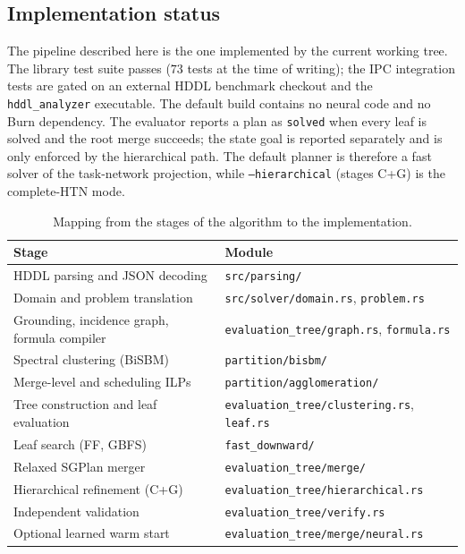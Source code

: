 \documentclass[11pt,a4paper]{article}
\begin{document}
\subsection{Implementation status}
The pipeline described here is the one implemented by the current working
tree. The library test suite passes ($73$ tests at the time of writing); the
IPC integration tests are gated on an external HDDL benchmark checkout and the
\texttt{hddl\_analyzer} executable. The default build contains no neural code
and no Burn dependency. The evaluator reports a plan as \texttt{solved} when
every leaf is solved and the root merge succeeds; the state goal is reported
separately and is only enforced by the hierarchical path. The default planner
is therefore a fast solver of the task-network projection, while
\texttt{--hierarchical} (stages C+G) is the complete-HTN mode.

\begin{table}[h]
\centering
\small
\begin{tabular}{@{}ll@{}}
\toprule
Stage & Module \\
\midrule
HDDL parsing and JSON decoding & \texttt{src/parsing/} \\
Domain and problem translation & \texttt{src/solver/domain.rs}, \texttt{problem.rs} \\
Grounding, incidence graph, formula compiler & \texttt{evaluation\_tree/graph.rs}, \texttt{formula.rs} \\
Spectral clustering (BiSBM) & \texttt{partition/bisbm/} \\
Merge-level and scheduling ILPs & \texttt{partition/agglomeration/} \\
Tree construction and leaf evaluation & \texttt{evaluation\_tree/clustering.rs}, \texttt{leaf.rs} \\
Leaf search (FF, GBFS) & \texttt{fast\_downward/} \\
Relaxed SGPlan merger & \texttt{evaluation\_tree/merge/} \\
Hierarchical refinement (C+G) & \texttt{evaluation\_tree/hierarchical.rs} \\
Independent validation & \texttt{evaluation\_tree/verify.rs} \\
Optional learned warm start & \texttt{evaluation\_tree/merge/neural.rs} \\
\bottomrule
\end{tabular}
\caption{Mapping from the stages of the algorithm to the implementation.}
\end{table}
\end{document}
